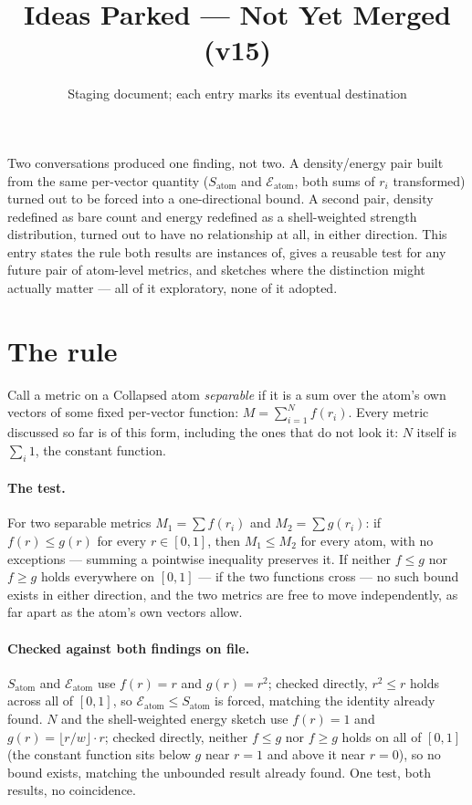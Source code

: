 \documentclass[11pt]{article}
\title{Ideas Parked --- Not Yet Merged (v15)}
\author{Staging document; each entry marks its eventual destination}
\date{}
\begin{document}
\maketitle

\noindent Two conversations produced one finding, not two. A
density/energy pair built from the same per-vector quantity
($S_{\text{atom}}$ and $\mathcal{E}_{\text{atom}}$, both sums of
$r_i$ transformed) turned out to be forced into a one-directional
bound. A second pair, density redefined as bare count and energy
redefined as a shell-weighted strength distribution, turned out to
have no relationship at all, in either direction. This entry states
the rule both results are instances of, gives a reusable test for
any future pair of atom-level metrics, and sketches where the
distinction might actually matter --- all of it exploratory, none
of it adopted.

\section{The rule}

Call a metric on a Collapsed atom \emph{separable} if it is a sum
over the atom's own vectors of some fixed per-vector function:
$M=\sum_{i=1}^N f(r_i)$. Every metric discussed so far is of this
form, including the ones that do not look it: $N$ itself is
$\sum_i 1$, the constant function.

\paragraph{The test.} For two separable metrics $M_1=\sum f(r_i)$
and $M_2=\sum g(r_i)$: if $f(r)\le g(r)$ for every $r\in[0,1]$, then
$M_1\le M_2$ for every atom, with no exceptions --- summing a
pointwise inequality preserves it. If neither $f\le g$ nor $f\ge g$
holds everywhere on $[0,1]$ --- if the two functions cross --- no
such bound exists in either direction, and the two metrics are free
to move independently, as far apart as the atom's own vectors allow.

\paragraph{Checked against both findings on file.} $S_{\text{atom}}$
and $\mathcal{E}_{\text{atom}}$ use $f(r)=r$ and $g(r)=r^2$; checked
directly, $r^2\le r$ holds across all of $[0,1]$, so
$\mathcal{E}_{\text{atom}}\le S_{\text{atom}}$ is forced, matching
the identity already found. $N$ and the shell-weighted energy
sketch use $f(r)=1$ and $g(r)=\lfloor r/w\rfloor\cdot r$; checked
directly, neither $f\le g$ nor $f\ge g$ holds on all of $[0,1]$ (the
constant function sits below $g$ near $r=1$ and above it near
$r=0$), so no bound exists, matching the unbounded result already
found. One test, both results, no coincidence.
\end{document}

